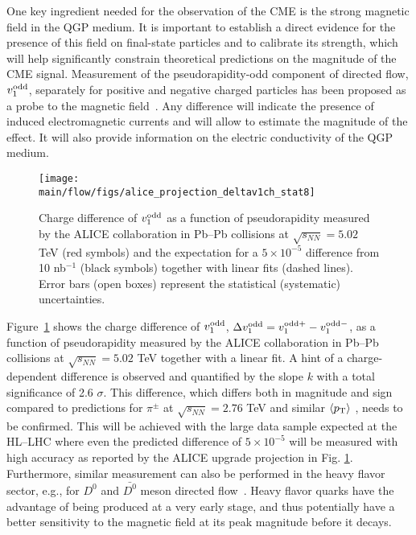 One key ingredient needed for the observation of the CME is the strong magnetic field in the QGP medium. It is important to establish a direct
evidence for the presence of this field on final-state particles and to calibrate its strength, which will help significantly constrain theoretical predictions on the magnitude of the CME signal. Measurement of the pseudorapidity-odd component of directed 
flow, $v_1^{\rm odd}$, separately for positive and negative charged particles has been proposed as a probe to 
the magnetic field~\cite{Gursoy:2014aka}. Any difference will indicate the presence of induced electromagnetic 
currents and will allow to estimate the magnitude of the effect. It will also provide information on the electric conductivity of the QGP medium.


\begin{figure}[!htb]
\begin{center}
\texttt{[image: \\main/flow/figs/alice\_projection\_deltav1ch\_stat8]}
\caption{Charge difference of $v_1^{\rm odd}$ as a function of pseudorapidity measured by the ALICE collaboration in Pb--Pb collisions at $\sqrt{s_{NN}}=5.02$ TeV  \cite{Margutti:2017lup} (red symbols) and the expectation for a $5 \times 10^{-5}$ difference \cite{Gursoy:2014aka} from 10 nb$^{-1}$ (black symbols) together with linear fits (dashed lines). Error bars (open boxes) represent the statistical (systematic) uncertainties.}
\label{fig:alice_delta_v1}
\end{center}
\end{figure}


Figure~\ref{fig:alice_delta_v1} shows the charge difference of $v_1^{\rm odd}$, 
$\Delta v_1^{\rm odd}=v_1^{\rm odd +} - v_1^{\rm odd -}$, as a function of pseudorapidity measured by the ALICE collaboration in Pb--Pb collisions 
at $\sqrt{s_{NN}}=5.02$ TeV \cite{Margutti:2017lup} together with a linear fit. A hint of a charge-dependent difference is observed and quantified 
by the slope $k$ with a total significance of 2.6 $\sigma$. This difference, which differs both in magnitude and sign compared to predictions for 
$\pi^{\pm}$ at $\sqrt{s_{NN}}=2.76$ TeV and similar $\langle p_{\rm T} \rangle$ \cite{Gursoy:2014aka}, needs to be confirmed. 
This will be achieved 
with the large data sample expected at the HL--LHC where even the predicted difference of $5 \times 10^{-5}$ will be measured with high accuracy 
as reported by the ALICE upgrade projection in Fig. \ref{fig:alice_delta_v1}. Furthermore, similar measurement can also be performed
in the heavy flavor sector, e.g., for $D^{0}$ and $\bar{D^{0}}$ meson directed flow~\cite{Das:2016cwd}. Heavy flavor quarks have the advantage of
being produced at a very early stage, and thus potentially have a better sensitivity to the magnetic field at its peak magnitude before it decays.




